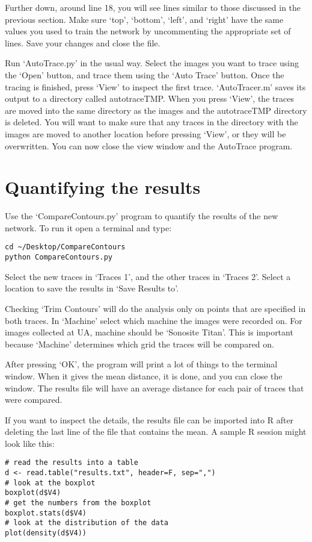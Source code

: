 \documentclass{article}
\begin{document}
Further down, around line 18, you will see lines similar to those discussed in the previous section. Make sure `top', `bottom', `left', and `right' have the same values you used to train the network by uncommenting the appropriate set of lines. Save your changes and close the file.

Run `AutoTrace.py' in the usual way. Select the images you want to trace using the `Open' button, and trace them using the `Auto Trace' button. Once the tracing is finished, press `View' to inspect the first trace. `AutoTracer.m' saves its output to a directory called autotraceTMP. When you press `View', the traces are moved into the same directory as the images and the autotraceTMP directory is deleted. You will want to make sure that any traces in the directory with the images are moved to another location before pressing `View', or they will be overwritten. You can now close the view window and the AutoTrace program. 

\section{Quantifying the results}
Use the `CompareContours.py' program to quantify the results of the new network. To run it open a terminal and type:
\begin{verbatim}
cd ~/Desktop/CompareContours
python CompareContours.py
\end{verbatim}
Select the new traces in `Traces 1', and the other traces in `Traces 2'. Select a location to save the results in `Save Results to'.

Checking `Trim Contours' will do the analysis only on points that are specified in both traces. In `Machine' select which machine the images were recorded on. For images collected at UA, machine should be `Sonosite Titan'. This is important because `Machine' determines which grid the traces will be compared on. 

After pressing `OK', the program will print a lot of things to the terminal window. When it gives the mean distance, it is done, and you can close the window. The results file will have an average distance for each pair of traces that were compared. 

If you want to inspect the details, the results file can be imported into R after deleting the last line of the file that contains the mean. A sample R session might look like this:
\begin{verbatim}
# read the results into a table
d <- read.table("results.txt", header=F, sep=",")
# look at the boxplot
boxplot(d$V4)
# get the numbers from the boxplot
boxplot.stats(d$V4)
# look at the distribution of the data
plot(density(d$V4))
\end{verbatim}
\end{document}
